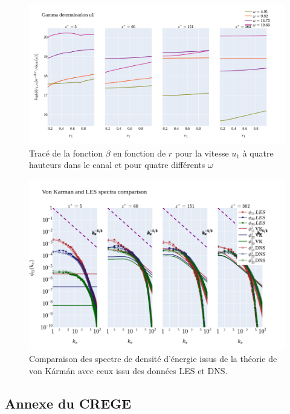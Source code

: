 \documentclass[12pt]{article}
\theoremstyle{plain}
\theoremstyle{remark}
\begin{document}
\begin{figure}[H]
	\begin{center}
		\includegraphics[width=0.9\linewidth]{../../output/figures/channel_wrles_retau395/split_time/gamma/gamma_u1_r.png}
		\caption{Tracé de la fonction $\beta$ en fonction de $r$ pour la vitesse $u_1$ à quatre hauteurs dans le canal et pour quatre différents $\omega$}
		\label{fig:gamma_r}
	\end{center}
\end{figure}

\begin{figure}[H]
	\begin{center}
		\includegraphics[width=0.9\linewidth]{../../output/figures/channel_wrles_retau395/split_time/von_karman/von_karman_spectra.png}
		\caption{Comparaison des spectre de densité d'énergie issus de la théorie de von Kármán avec ceux issu des données LES et DNS.}
		\label{fig:vk_spectra_zoom}
	\end{center}
\end{figure}

\pagebreak


\subsection{Annexe du CREGE}
\end{document}
